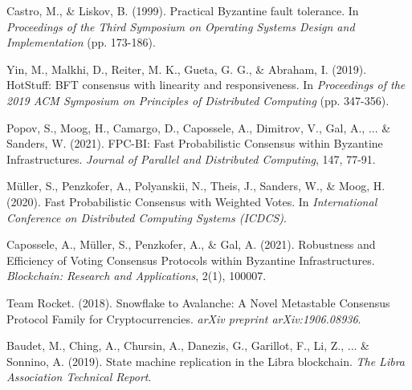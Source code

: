 \documentclass[11pt,a4paper]{article}
\begin{document}
\begin{thebibliography}{99}

Castro, M., \& Liskov, B. (1999). Practical Byzantine fault tolerance. In \textit{Proceedings of the Third Symposium on Operating Systems Design and Implementation} (pp. 173-186).

Yin, M., Malkhi, D., Reiter, M. K., Gueta, G. G., \& Abraham, I. (2019). HotStuff: BFT consensus with linearity and responsiveness. In \textit{Proceedings of the 2019 ACM Symposium on Principles of Distributed Computing} (pp. 347-356).

Popov, S., Moog, H., Camargo, D., Capossele, A., Dimitrov, V., Gal, A., ... \& Sanders, W. (2021). FPC-BI: Fast Probabilistic Consensus within Byzantine Infrastructures. \textit{Journal of Parallel and Distributed Computing}, 147, 77-91.

Müller, S., Penzkofer, A., Polyanskii, N., Theis, J., Sanders, W., \& Moog, H. (2020). Fast Probabilistic Consensus with Weighted Votes. In \textit{International Conference on Distributed Computing Systems (ICDCS)}.

Capossele, A., Müller, S., Penzkofer, A., \& Gal, A. (2021). Robustness and Efficiency of Voting Consensus Protocols within Byzantine Infrastructures. \textit{Blockchain: Research and Applications}, 2(1), 100007.

Team Rocket. (2018). Snowflake to Avalanche: A Novel Metastable Consensus Protocol Family for Cryptocurrencies. \textit{arXiv preprint arXiv:1906.08936}.

Baudet, M., Ching, A., Chursin, A., Danezis, G., Garillot, F., Li, Z., ... \& Sonnino, A. (2019). State machine replication in the Libra blockchain. \textit{The Libra Association Technical Report}.

\end{thebibliography}
\end{document}
